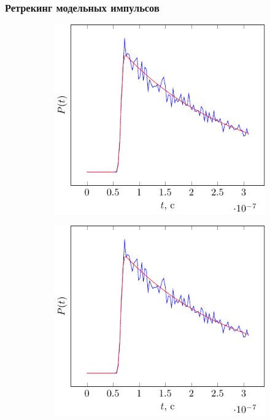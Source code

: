 \documentclass[10pt,pdf,hyperref={unicode}, dvipsnames]{beamer}
\begin{document}

\begin{frame}
\frametitle{Ретрекинг модельных импульсов}
\vskip -3pt
\begin{figure}
    \centering
    \begin{subfigure}{0.42\linewidth}
        \centering
        \includegraphics[width=1\linewidth,page=1]{fig/retracking/model}
    \end{subfigure}
    \hfill
    \begin{subfigure}{0.42\linewidth}
        \centering
        \includegraphics[width=1\linewidth,page=2]{fig/retracking/model}

\end{subfigure}
\end{figure}
\end{frame}
\end{document}
